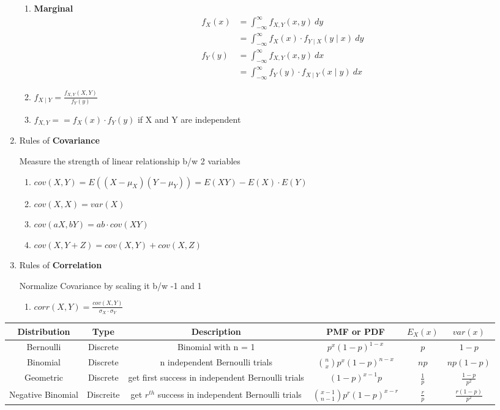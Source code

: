 \documentclass{article}
\begin{document}
\begin{small}
\begin{enumerate}
\begin{enumerate}
\item\textbf{Marginal}
\begin{align*}
f_X(x) & = \int_{-\infty}^{\infty} f_{X,Y}(x, y) \ dy \\
       & = \int_{-\infty}^{\infty} f_X(x) \cdot f_{Y \mid X}(y \mid x) \ dy \\
f_Y(y) & = \int_{-\infty}^{\infty} f_{X,Y}(x, y) \ dx \\
       & = \int_{-\infty}^{\infty} f_Y(y) \cdot f_{X \mid Y}(x \mid y) \ dx
\end{align*}
\item $f_{X \mid Y} = \frac{f_{X, Y}(X, Y)}{f_Y(y)}$
\item $f_{X, Y} == f_X(x) \cdot f_Y(y)$ if X and Y are independent
\end{enumerate}

\item Rules of \textbf{Covariance}

Measure the strength of linear relationship b/w 2 variables

\begin{enumerate}
\item $cov(X, Y) = E((X - \mu_X)(Y - \mu_Y)) = E(XY) - E(X) \cdot E(Y)$
\item $cov(X, X) = var(X)$
\item $cov(aX, bY) = ab \cdot cov(XY)$
\item $cov(X, Y+Z) = cov(X, Y) + cov(X, Z)$
\end{enumerate}

\item Rules of \textbf{Correlation}

Normalize Covariance by scaling it b/w -1 and 1

\begin{enumerate}
\item $corr(X, Y) = \frac{cov(X, Y)}{\sigma_X \cdot \sigma_Y}$
\end{enumerate}

\end{enumerate}

\pagebreak

\center\begin{tabular}{ |c|c|c|c|c|c| }
\hline 
Distribution & Type & Description & PMF or PDF & $E_X(x)$ & $var(x)$ \\
\hline
Bernoulli & Discrete & Binomial with n = 1 & $ p^{x}(1-p)^{1-x}$ & $p$ & $1 - p$ \\
Binomial & Discrete & n independent Bernoulli trials & $\binom{n}{x}p^{x}(1-p)^{n-x}$ & $np$ & $np(1 - p)$ \\
Geometric & Discrete & get first success in independent Bernoulli trials & $(1 - p)^{x - 1}p$ & $\frac{1}{p}$ & $\frac{1 - p}{p^2}$ \\
Negative Binomial & Discreite & get $r^{th}$ success in independent Bernoulli trials & $\binom{x - 1}{n - 1}p^{r}(1 - p)^{x - r}$ & $\frac{r}{p}$ & $\frac{r(1 - p)}{p^2}$ \\
\hline
\end{tabular}



\end{small}
\end{document}

